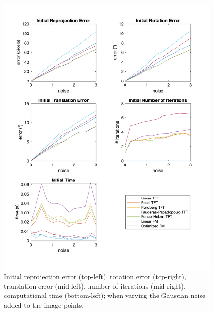\begin{figure}[p]
	\centering
	\includegraphics[width=1\textwidth]{Experiments/Synthetic/noise/INITnoisePlots.png}
	\caption{Initial reprojection error (top-left), rotation error (top-right), translation error (mid-left), number of iterations (mid-right), computational time (bottom-left); when varying the Gaussian noise added to the image points.}
	\label{fig:initNoisePlot}
\end{figure}


